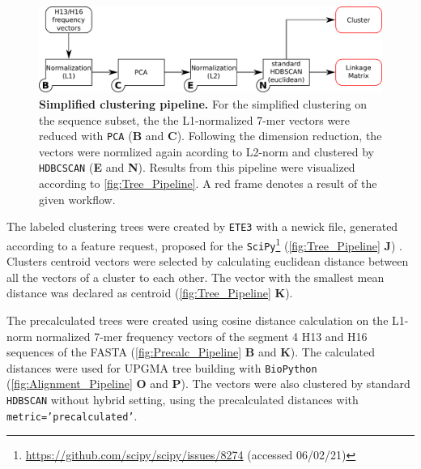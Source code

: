 \begin{figure}[!hbt]
    \centering
    \includegraphics[width=\textwidth]{Graphics/Simple.pdf}
    \caption[Simplified clustering pipeline]{\textbf{Simplified clustering pipeline.} For the simplified clustering on the sequence subset, the the L1-normalized 7-mer vectors were reduced with \texttt{PCA} (\textsf{\textbf{B}} and \textsf{\textbf{C}}). Following the dimension reduction, the vectors were normlized again acording to L2-norm and clustered by \texttt{HDBCSCAN} (\textsf{\textbf{E}} and \textsf{\textbf{N}}). Results from this pipeline were visualized according to \autoref{fig:Tree_Pipeline}. A red frame denotes a result of the given workflow.}
    \label{fig:Simple_Pipeline}
\end{figure}

The labeled clustering trees were created by \texttt{ETE3} with a newick file, generated according to a feature request, proposed for the \texttt{SciPy}\footnote{\url{https://github.com/scipy/scipy/issues/8274} (accessed 06/02/21)} (\autoref{fig:Tree_Pipeline} \textsf{\textbf{J}}) \autocite{huerta-cepas_ete_2016}. Clusters centroid vectors were selected by calculating euclidean distance between all the vectors of a cluster to each other. The vector with the smallest mean distance was declared as centroid (\autoref{fig:Tree_Pipeline} \textsf{\textbf{K}}). 


The precalculated trees were created using cosine distance calculation on the L1-norm normalized 7-mer frequency vectors of the segment 4 H13 and H16 sequences of the FASTA (\autoref{fig:Precalc_Pipeline} \textsf{\textbf{B}} and \textsf{\textbf{K}}). The calculated distances were used for \gls{UPGMA} tree building with \texttt{BioPython} (\autoref{fig:Alignment_Pipeline} \textsf{\textbf{O}} and \textsf{\textbf{P}}). The vectors were also clustered by standard \texttt{HDBSCAN} without hybrid setting, using the precalculated distances with \texttt{metric='precalculated'}. 

